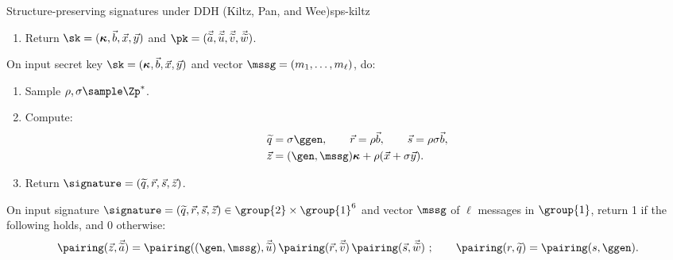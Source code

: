 \begin{primitivebox}{Structure-preserving signatures under DDH (Kiltz, Pan, and
  Wee)}{sps-kiltz}
\begin{description}
\begin{enumerate}
        \item Return $\sk = (\boldsymbol{\kappa}, \vec{{b}}, \vec{{x}},
          \vec{{y}})$ and $\pk = (\vec{\widetilde{a}}, \vec{\widetilde{u}},
          \vec{\widetilde{v}}, \vec{\widetilde{w}})$.

      \end{enumerate}

    \item[$\signature \sample \SPSsign(\sk, \mssg)$ :] On input secret key $\sk
      = (\boldsymbol{\kappa}, \vec{{b}}, \vec{{x}}, \vec{{y}})$ and vector
      $\mssg = ({m}_1, \ldots, {m}_\ell)$, do:

      \begin{enumerate}

        \item Sample $\rho, \sigma \sample \Zp^*$.

        \item Compute:
          \begin{align*}
            \widetilde{q} &= \sigma\ggen, \qquad \vec{{r}} = \rho\vec{{b}},
            \qquad \vec{{s}} = \rho\sigma\vec{{b}}, \\ \vec{{z}} &= (\gen,
            \mssg)\boldsymbol{\kappa} + \rho (\vec{{x}}+\sigma\vec{{y}}).
          \end{align*}

        \item Return $\signature = (\widetilde{q}, \vec{{r}}, \vec{{s}},
          \vec{{z}})$.

      \end{enumerate}

    \item[$\{0,1\} \leftarrow \SPSverify(\pk, \mssg, \signature)$ :] On input
      signature $\signature =(\widetilde{q}, \vec{r}, \vec{s}, \vec{z}) \in
      \group{2}\times\group{1}^6$ and vector $\mssg$ of $\ell$ messages in
      $\group{1}$, return 1 if the following holds, and 0 otherwise:
      \begin{equation}
        \pairing(\vec{z}, \vec{\widetilde{a}}) = \pairing((\gen, \mssg),
        \vec{\widetilde{u}})\, \pairing(\vec{{r}},\vec{\widetilde{v}})\,
        \pairing(\vec{{s}}, \vec{\widetilde{w}}) \ ; \qquad \pairing({r},
        \widetilde{q}) = \pairing({s}, \ggen).
      \end{equation} \label{eq:kiltz-ver}

  \end{description}

\end{primitivebox}

